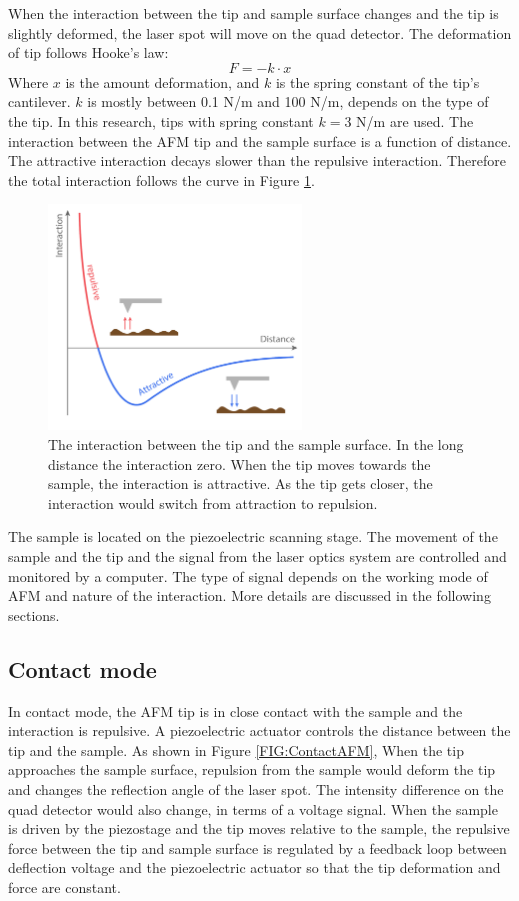 \documentclass[pdflatex, sectionletters, 12pt]{pittetd}    %
\begin{document}
When the interaction between the tip and sample surface changes and the tip is slightly deformed, the laser spot will move on the quad detector. The deformation of tip follows Hooke's law:
$$F = -k \cdot x$$
Where $x$ is the amount deformation, and $k$ is the spring constant of the tip's cantilever. $k$ is mostly between 0.1 N/m and 100 N/m, depends on the type of the tip. In this research, tips with spring constant $k = 3$ N/m are used. The interaction between the AFM tip and the sample surface is a function of distance. The attractive interaction decays slower than the repulsive interaction. Therefore the total interaction follows the curve in Figure \ref{FIG:Interaction}.
\\

\begin{figure}[h!]
	\centering
	\includegraphics[width=0.6\textwidth]{Drawing/Interaction.pdf}
	\caption{The interaction between the tip and the sample surface. In the long distance the interaction zero. When the tip moves towards the sample, the interaction is attractive. As the tip gets closer, the interaction would switch from attraction to repulsion.}
	\label{FIG:Interaction}
\end{figure}

The sample is located on the piezoelectric scanning stage. The movement of the sample and the tip and the signal from the laser optics system are controlled and monitored by a computer. The type of signal depends on the working mode of AFM and nature of the interaction. More details are discussed in the following sections. 

\subsection{Contact mode}

In contact mode, the AFM tip is in close contact with the sample and the interaction is repulsive. A piezoelectric actuator controls the distance between the tip and the sample. As shown in Figure \ref{FIG:ContactAFM}, When the tip approaches the sample surface, repulsion from the sample would deform the tip and changes the reflection angle of the laser spot. The intensity difference on the quad detector would also change, in terms of a voltage signal. When the sample is driven by the piezostage and the tip moves relative to the sample, the repulsive force between the tip and sample surface is regulated by a feedback loop between deflection voltage and the piezoelectric actuator so that the tip deformation and force are constant. 
\\
\end{document}
